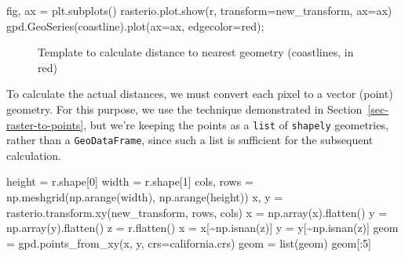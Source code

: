 \documentclass[
  letterpaper,
]{krantz}
\newenvironment{Shaded}{\begin{snugshade}}{\end{snugshade}}
\newcommand{\BuiltInTok}[1]{\textcolor[rgb]{0.00,0.23,0.31}{#1}}
\newcommand{\DecValTok}[1]{\textcolor[rgb]{0.68,0.00,0.00}{#1}}
\newcommand{\NormalTok}[1]{\textcolor[rgb]{0.00,0.23,0.31}{#1}}
\newcommand{\OperatorTok}[1]{\textcolor[rgb]{0.37,0.37,0.37}{#1}}
\newcommand{\StringTok}[1]{\textcolor[rgb]{0.13,0.47,0.30}{#1}}
\begin{document}
\begin{Shaded}
\begin{Highlighting}[]
\NormalTok{fig, ax }\OperatorTok{=}\NormalTok{ plt.subplots()}
\NormalTok{rasterio.plot.show(r, transform}\OperatorTok{=}\NormalTok{new\_transform, ax}\OperatorTok{=}\NormalTok{ax)}
\NormalTok{gpd.GeoSeries(coastline).plot(ax}\OperatorTok{=}\NormalTok{ax, edgecolor}\OperatorTok{=}\StringTok{\textquotesingle{}red\textquotesingle{}}\NormalTok{)}\OperatorTok{;}
\end{Highlighting}
\end{Shaded}

\begin{figure}[H]


\caption{\label{fig-raster-distances1}Template to calculate distance to
nearest geometry (coastlines, in red)}

\end{figure}%

To calculate the actual distances, we must convert each pixel to a
vector (point) geometry. For this purpose, we use the technique
demonstrated in Section~\ref{sec-raster-to-points}, but we're keeping
the points as a \texttt{list} of \texttt{shapely} geometries, rather
than a \texttt{GeoDataFrame}, since such a list is sufficient for the
subsequent calculation.

\begin{Shaded}
\begin{Highlighting}[]
\NormalTok{height }\OperatorTok{=}\NormalTok{ r.shape[}\DecValTok{0}\NormalTok{]}
\NormalTok{width }\OperatorTok{=}\NormalTok{ r.shape[}\DecValTok{1}\NormalTok{]}
\NormalTok{cols, rows }\OperatorTok{=}\NormalTok{ np.meshgrid(np.arange(width), np.arange(height))}
\NormalTok{x, y }\OperatorTok{=}\NormalTok{ rasterio.transform.xy(new\_transform, rows, cols)}
\NormalTok{x }\OperatorTok{=}\NormalTok{ np.array(x).flatten()}
\NormalTok{y }\OperatorTok{=}\NormalTok{ np.array(y).flatten()}
\NormalTok{z }\OperatorTok{=}\NormalTok{ r.flatten()}
\NormalTok{x }\OperatorTok{=}\NormalTok{ x[}\OperatorTok{\textasciitilde{}}\NormalTok{np.isnan(z)]}
\NormalTok{y }\OperatorTok{=}\NormalTok{ y[}\OperatorTok{\textasciitilde{}}\NormalTok{np.isnan(z)]}
\NormalTok{geom }\OperatorTok{=}\NormalTok{ gpd.points\_from\_xy(x, y, crs}\OperatorTok{=}\NormalTok{california.crs)}
\NormalTok{geom }\OperatorTok{=} \BuiltInTok{list}\NormalTok{(geom)}
\NormalTok{geom[:}\DecValTok{5}\NormalTok{]}
\end{Highlighting}
\end{Shaded}
\end{document}
